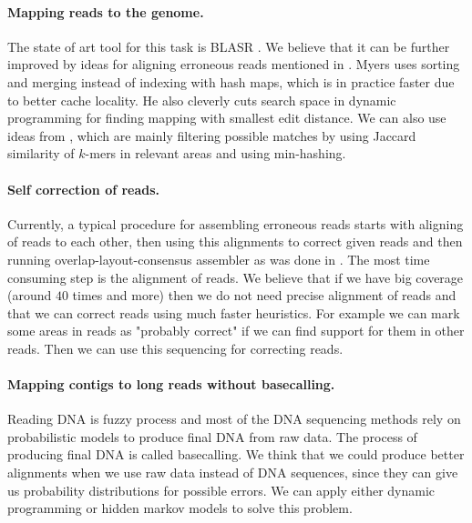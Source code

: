 \paragraph{Mapping reads to the genome.} The state of art tool
for this task is BLASR \citep{BLASR}. We believe
that it can be further improved by ideas for aligning erroneous reads
mentioned in \citet{myers2014efficient}. 
Myers uses sorting and merging instead of indexing with hash maps,
which is in practice faster due to better cache locality.
He also cleverly cuts search space in dynamic programming for finding mapping
with smallest edit distance.
We can also use ideas from \cite{MHAP}, which are mainly filtering
possible matches by using Jaccard similarity of $k$-mers in relevant areas
and using min-hashing.

\paragraph{Self correction of reads.}
Currently, a typical procedure for assembling erroneous reads
starts with aligning of reads to each other, then using this alignments
to correct given reads and then running overlap-layout-consensus assembler
as was done in \cite{MHAP}.
The most time consuming step is the alignment of reads.
We believe that if we have big coverage (around $40$ times and more) then
we do not need precise alignment of reads and that we can
correct reads using much faster heuristics. For example
we can mark some areas in reads as "probably correct" if we can
find support for them in other reads. Then we can
use this sequencing for correcting reads.

\paragraph{Mapping contigs to long reads without basecalling.}
Reading DNA is fuzzy process and most of the DNA sequencing
methods rely on probabilistic models to produce final DNA
from raw data. The process of producing final DNA is called basecalling.
We think that we could produce better alignments when
we use raw data instead of DNA sequences, since they can give
us probability distributions for possible errors.
We can apply either dynamic programming or hidden markov models
to solve this problem.

\label{LastPage}

